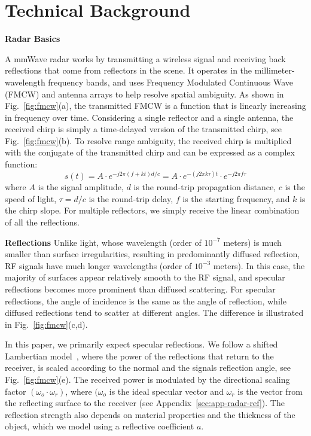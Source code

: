 \section{Technical Background}
\label{sec:background}
\noindent \textbf{Radar Basics}
\label{sec:background-mm}

A mmWave radar works by transmitting a wireless
signal and receiving back reflections that come from reflectors in the scene.
It operates in the millimeter-wavelength frequency bands, and uses Frequency Modulated Continuous Wave (FMCW) and antenna arrays to help resolve spatial ambiguity.
As shown in Fig.~\ref{fig:fmcw}(a), the transmitted FMCW is a function that is linearly increasing in frequency over time.
Considering a single reflector and a single antenna, the received chirp is simply a time-delayed version of the transmitted chirp, see Fig.~\ref{fig:fmcw}(b).
To resolve range ambiguity, the received chirp is multiplied with the conjugate of the transmitted chirp and can be expressed as a complex function:
\begin{equation}
\label{eq:fmcw}
s(t) =  A \cdot e^{-j 2 \pi(f+kt)   d /c}  = A \cdot e^{-(j 2\pi k \tau )t} \cdot e^{-j 2\pi f \tau}
\end{equation}
where $A$ is the signal amplitude, $d$ is the round-trip propagation distance, $c$ is the speed of light, $\tau=d/c$ is the round-trip delay, $f$ is the starting frequency, and $k$ is the chirp slope. For multiple reflectors, we simply receive the linear combination of all the reflections.



\vspace{-0.1em}
\noindent \textbf{Reflections}
Unlike light, whose wavelength (order of \( 10^{-7} \) meters) is much smaller than surface irregularities, resulting in predominantly diffused reflection, RF signals have much longer wavelengths (order of \( 10^{-3} \) meters).
In this case, the majority of surfaces appear relatively smooth to the RF signal, and specular reflections becomes more prominent than diffused scattering.
For specular reflections, the angle of incidence is the same as the angle of reflection, while diffused reflections tend to scatter at different angles. The difference is illustrated in Fig.~\ref{fig:fmcw}(c,d).

In this paper, we primarily expect specular reflections.
We follow a shifted Lambertian model~\cite{richards2010principles, ren2020diffuse}, where the power of the reflections that return to the receiver, is scaled according to the normal and the signals reflection angle, see Fig.~\ref{fig:fmcw}(e).
The received power is modulated by the directional scaling factor \( (\omega_o \cdot \omega_r) \), where \( (\omega_o\) is the ideal specular vector and \( \omega_r \) is the vector from the reflecting surface to the receiver (see Appendix~\ref{sec:app-radar-ref}).
The reflection strength also depends on material properties and the thickness of the object, which we model using a reflective coefficient \( a \).

